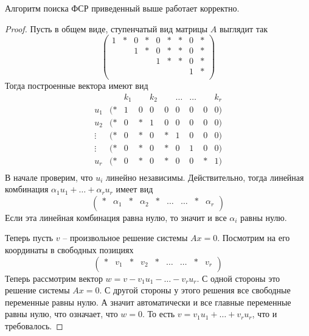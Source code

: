 \begin{claim}
\label{claim::FSSWell}
Алгоритм поиска ФСР приведенный выше работает корректно.
\end{claim}
\begin{proof}
Пусть в общем виде, ступенчатый вид матрицы $A$ выглядит так
\[
\begin{pmatrix}
{1}&{*}&{0}&{*}&{0}&{*}&{*}&{0}&{*}\\
{}&{}&{1}&{*}&{0}&{*}&{*}&{0}&{*}\\
{}&{}&{}&{}&{1}&{*}&{*}&{0}&{*}\\
{}&{}&{}&{}&{}&{}&{}&{1}&{*}\\
\end{pmatrix}
\]
Тогда построенные вектора имеют вид
\[
\begin{matrix}
{}&{}&{k_1}&{}&{k_2}&{}&{\ldots}&{\ldots}&{}&{k_r}\\
{u_1 }&{(*}&{1}&{0}&{0}&{0}&{0}&{0}&{0}&{0)}\\
{u_2}&{(*}&{0}&{*}&{1}&{0}&{0}&{0}&{0}&{0)}\\
{\vdots}&{(*}&{0}&{*}&{0}&{*}&{1}&{0}&{0}&{0)}\\
{\vdots}&{(*}&{0}&{*}&{0}&{*}&{0}&{1}&{0}&{0)}\\
{u_r}&{(*}&{0}&{*}&{0}&{*}&{0}&{0}&{*}&{1)}\\
\end{matrix}
\]
В начале проверим, что $u_i$ линейно независимы.
Действительно, тогда линейная комбинация $\alpha_1 u_1 +\ldots + \alpha_r u_r$ имеет вид
\[
\begin{pmatrix}
{*}&{\alpha_1}&{*}&{\alpha_2}&{*}&{\ldots}&{\ldots}&{*}&{\alpha_r}\\
\end{pmatrix}
\]
Если эта линейная комбинация равна нулю, то значит и все $\alpha_i$ равны нулю.

Теперь пусть $v$ -- произвольное решение системы $Ax = 0$.
Посмотрим на его координаты в свободных позициях
\[
\begin{pmatrix}
{*}&{v_1}&{*}&{v_2}&{*}&{\ldots}&{\ldots}&{*}&{v_r}\\
\end{pmatrix}
\]
Теперь рассмотрим вектор $w = v - v_1 u_1 - \ldots - v_r u_r$.
С одной стороны это решение системы $Ax = 0$.
С другой стороны у этого решения все свободные переменные равны нулю.
А значит автоматически и все главные переменные равны нулю, что означает, что $w  = 0$.
То есть $v = v_1 u_1 + \ldots + v_r u_r$, что и требовалось.
\end{proof}

